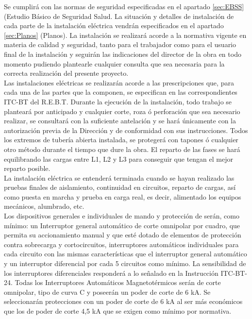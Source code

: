 Se cumplirá con las normas de seguridad especificadas en el apartado \ref{sec:EBSS} (Estudio Básico de Seguridad Salud.
La situación y detalles de instalación de cada parte de la instalación eléctrica vendrán especificados en el apartado \ref{sec:Planos} (Planos). La instalación se realizará acorde a la normativa vigente en materia de calidad y seguridad, tanto para el trabajador como para el usuario final de la instalación y seguirán las indicaciones del director de la obra en todo momento pudiendo plantearle cualquier consulta que sea necesaria para la correcta realización del presente proyecto.\\

Las instalaciones eléctricas se realizarán acorde a las prescripciones que, para cada una de las partes que la componen, se especifican en las correspondientes ITC-BT del R.E.B.T. Durante la ejecución de la instalación, todo trabajo se planteará por anticipado y cualquier corte, roza ó perforación que sea necesario realizar, se consultará con la suficiente antelación y se hará únicamente con la autorización previa de la Dirección y de conformidad con sus instrucciones. Todos los extremos de tubería abierta instalada, se protegerá con tapones ó cualquier otro método durante el tiempo que dure la obra. El reparto de las fases se hará equilibrando las cargas entre L1, L2 y L3 para conseguir que tengan el mejor reparto posible.\\

La instalación eléctrica se entenderá terminada cuando se hayan realizado las pruebas finales de aislamiento, continuidad en circuitos, reparto de cargas, así como puesta en marcha y prueba en carga real, es decir, alimentado los equipos mecánicos, alumbrado, etc.\\

Los dispositivos generales e individuales de mando y protección de serán, como mínimo: un Interruptor general automático de corte omnipolar por cuadro, que permita su accionamiento manual y que esté dotado de elementos de protección contra sobrecarga y cortocircuitos, interruptores automáticos individuales para cada circuito con las mismas características que el interruptor general automático y un interruptor diferencial por cada 5 circuitos como mínimo. La sensibilidad de los interruptores diferenciales responderá a lo señalado en la Instrucción ITC-BT-24. Todas los Interruptores Automáticos Magnetotérmicos serán de corte omnipolar, tipo de curva C y poseerán un poder de corte de 6 kA. Se seleccionarán protecciones con un poder de corte de 6 kA al ser más económicos que los de poder de corte 4,5 kA que se exigen como mínimo por normativa.\\


